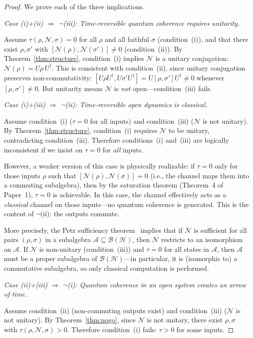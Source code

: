 \documentclass[prl,twocolumn,superscriptaddress,longbibliography]{revtex4-2}
\newcommand{\chan}{\mathcal{N}}
\newcommand{\hilb}{\mathcal{H}}
\newcommand{\tauasym}{\tau}
\begin{document}
\begin{proof}
We prove each of the three implications.

\emph{Case (i)+(ii) $\Rightarrow$ $\neg$(iii):
Time-reversible quantum coherence requires unitarity.}

Assume $\tauasym(\rho, \chan, \sigma) = 0$ for all $\rho$ and
all faithful $\sigma$ (condition~(i)), and that there exist
$\rho, \sigma'$ with $[\chan(\rho), \chan(\sigma')] \neq 0$
(condition~(ii)).  By Theorem~\ref{thm:structure}, condition~(i)
implies $\chan$ is a unitary conjugation:
$\chan(\rho) = U\rho\, U^\dagger$.  This is consistent with
condition~(ii), since unitary conjugation preserves
non-commutativity:
$[U\rho U^\dagger, U\sigma' U^\dagger]
= U[\rho, \sigma']U^\dagger \neq 0$
whenever $[\rho, \sigma'] \neq 0$.  But unitarity means
$\chan$ is \emph{not} open---condition~(iii) fails.

\emph{Case (i)+(iii) $\Rightarrow$ $\neg$(ii):
Time-reversible open dynamics is classical.}

Assume condition~(i) ($\tauasym = 0$ for all inputs) and
condition~(iii) ($\chan$ is not unitary).
By Theorem~\ref{thm:structure}, condition~(i) requires $\chan$
to be unitary, contradicting condition~(iii).  Therefore
conditions~(i) and~(iii) are logically inconsistent if we insist on
$\tauasym = 0$ for \emph{all} inputs.

However, a weaker version of this case is physically realizable:
if $\tauasym = 0$ only for those inputs $\rho$ such that
$[\chan(\rho), \chan(\sigma)] = 0$ (i.e., the channel maps them
into a commuting subalgebra), then by the saturation theorem
(Theorem~4 of Paper~1), $\tauasym = 0$ is achievable.  In this
case, the channel effectively acts as a \emph{classical} channel
on those inputs---no quantum coherence is generated.  This is the
content of $\neg$(ii): the outputs commute.

More precisely, the Petz sufficiency theorem~\cite{Petz1988} implies
that if $\chan$ is sufficient for all pairs $(\rho, \sigma)$ in a
subalgebra $\mathcal{A} \subseteq \mathcal{B}(\hilb)$, then
$\chan$ restricts to an isomorphism on $\mathcal{A}$.  If $\chan$
is non-unitary (condition~(iii)) and $\tauasym = 0$ for all states
in $\mathcal{A}$, then $\mathcal{A}$ must be a proper subalgebra
of $\mathcal{B}(\hilb)$---in particular, it is (isomorphic to) a
commutative subalgebra, so only classical computation is performed.

\emph{Case (ii)+(iii) $\Rightarrow$ $\neg$(i):
Quantum coherence in an open system creates an arrow of time.}

Assume condition~(ii) (non-commuting outputs exist) and
condition~(iii) ($\chan$ is not unitary).  By
Theorem~\ref{thm:nogo}, since $\chan$ is not unitary, there
exist $\rho, \sigma$ with $\tauasym(\rho, \chan, \sigma) > 0$.
Therefore condition~(i) fails: $\tauasym > 0$ for some inputs.
\end{proof}
\end{document}
